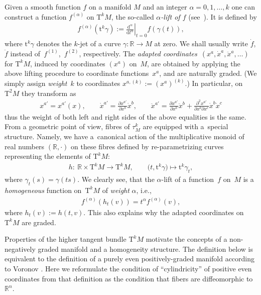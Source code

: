 \documentclass[pdftex]{sigma}
\newcommand{\R}{\mathbb{R}}
\newcommand{\pa}{\partial}
\newcommand{\dd}{\mathrm{d}}
\newcommand{\ra}{\rightarrow}
\newcommand{\TT}[1]{\mathrm{T}^{#1}} %
\newcommand{\tclass}[2]{\bm{\mathrm{t}}^{#1}#2} %
\numberwithin{equation}{section}
\theoremstyle{definition}
\begin{document}
Given a smooth function $f$ on a manifold $M$ and an integer $\alpha=0,1,\hdots,k$ one can construct a function $f^{(\alpha)}$ on $\TT k M$, the so-called \emph{$\alpha$-lift of $f$} (see~\cite{Morimoto_Lifts}). It is defined by
\begin{gather*}
f^{(\alpha)}(\tclass{k}{\gamma}):= \left.\frac{\dd^\alpha}{\dd t^\alpha}\right|_{t=0} f(\gamma(t)),
\end{gather*}
where $\tclass{k}{\gamma}$ denotes the $k$-{jet} of a curve $\gamma\colon \R \ra M$ at zero. We shall usually write $\dot{f}$, $\ddot{f}$ instead of~$f^{(1)}$,~$f^{(2)}$, respectively. The \emph{adapted coordinates}~$(x^{a}, \dot{x}^a, \ddot{x}^a, \ldots)$ for $\TT{k} M$, induced by coordinates $(x^a)$ on~$M$, are obtained by applying the above lifting procedure to coordinate functions~$x^a$, and are naturally graded. (We simply assign \emph{weight}~$k$ to coordinates \mbox{$x^{a, (k)} := (x^a)^{(k)}$}.) In particular, on $\TT{2} M$ they transform as
\begin{gather}\label{e:T2M}
x^{a'}=x^{a'}(x), \qquad \dot{x}^{a'} = \frac{\partial x^{a'}}{\pa x^b} \dot{x}^b, \qquad
\ddot{x}^{a'} = \frac{\pa x^{a'}}{\pa x^b} \ddot{x}^b + \frac{\pa^2 x^{a'}}{\pa x^b\pa x^c}\dot{x}^b \dot{x}^c
\end{gather}
thus the weight of both left and right sides of the above equalities is the same. From a geo\-metric point of view, fibres of $\tau^k_M$ are equipped with a~special structure. Namely, we have a~canonical action of the multiplicative monoid of real numbers $(\R, \cdot)$ on these fibres defined by re-parametrizing curves representing the elements of $\TT{k} M$:
\begin{gather*}
h\colon \ \R \times \TT{k} M \ra \TT{k} M, \qquad \big(t, \tclass{k}{\gamma}\big) \mapsto \tclass{k}{\gamma_t},
\end{gather*}
where $\gamma_t(s)=\gamma(ts)$. We clearly see, that the $\alpha$-lift of a function~$f$ on~$M$ is a \emph{homogeneous} function on~$\TT{k} M$ of \emph{weight} $\alpha$, i.e.,{\samepage
\begin{gather*}
f^{(\alpha)}(h_t(v)) = t^\alpha f^{(\alpha)}(v),
\end{gather*}
where $h_t(v) := h(t, v)$. This also explains why the adapted coordinates on $\TT{k} M$ are graded.}

Properties of the higher tangent bundle $\TT{k} M$ motivate the concepts of a non-negatively graded manifold and a homogeneity structure. The definition below is equivalent to the definition of a purely even positively-graded manifold according to Voronov \cite[Definition~4.1]{Voronov_2002}. Here we reformulate the condition of ``cylindricity'' of positive even coordinates from that definition as the condition that fibers are diffeomorphic to~$\R^n$.
\end{document}
